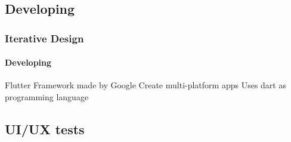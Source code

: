 \documentclass{beamer}
\begin{document}
	\subsection{Developing}
	\begin{frame}
		\frametitle{Iterative Design}
		\framesubtitle{Developing}
		
		\begin{alertblock}{Flutter}
			Framework made by Google
			\linebreak
			Create multi-platform apps
			\linebreak
			Uses dart as programming language
		\end{alertblock}
	\end{frame}
	
	\subsection{UI/UX tests}
\end{document}
